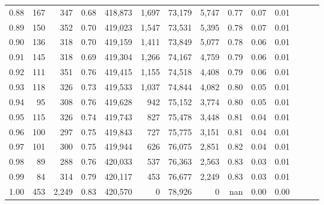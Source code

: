 \begin{tabular}{rrrrrrrrrrrrrr}
0.88 &     167 &    347 &  0.68 &  418,873 &    1,697 &  73,179 &   5,747 &  0.77 &  0.07 &      0.01 \\
0.89 &     150 &    352 &  0.70 &  419,023 &    1,547 &  73,531 &   5,395 &  0.78 &  0.07 &      0.01 \\
0.90 &     136 &    318 &  0.70 &  419,159 &    1,411 &  73,849 &   5,077 &  0.78 &  0.06 &      0.01 \\
0.91 &     145 &    318 &  0.69 &  419,304 &    1,266 &  74,167 &   4,759 &  0.79 &  0.06 &      0.01 \\
0.92 &     111 &    351 &  0.76 &  419,415 &    1,155 &  74,518 &   4,408 &  0.79 &  0.06 &      0.01 \\
0.93 &     118 &    326 &  0.73 &  419,533 &    1,037 &  74,844 &   4,082 &  0.80 &  0.05 &      0.01 \\
0.94 &      95 &    308 &  0.76 &  419,628 &      942 &  75,152 &   3,774 &  0.80 &  0.05 &      0.01 \\
0.95 &     115 &    326 &  0.74 &  419,743 &      827 &  75,478 &   3,448 &  0.81 &  0.04 &      0.01 \\
0.96 &     100 &    297 &  0.75 &  419,843 &      727 &  75,775 &   3,151 &  0.81 &  0.04 &      0.01 \\
0.97 &     101 &    300 &  0.75 &  419,944 &      626 &  76,075 &   2,851 &  0.82 &  0.04 &      0.01 \\
0.98 &      89 &    288 &  0.76 &  420,033 &      537 &  76,363 &   2,563 &  0.83 &  0.03 &      0.01 \\
0.99 &      84 &    314 &  0.79 &  420,117 &      453 &  76,677 &   2,249 &  0.83 &  0.03 &      0.01 \\
1.00 &     453 &  2,249 &  0.83 &  420,570 &        0 &  78,926 &       0 &   nan &  0.00 &      0.00 \\
\bottomrule
\end{tabular}
